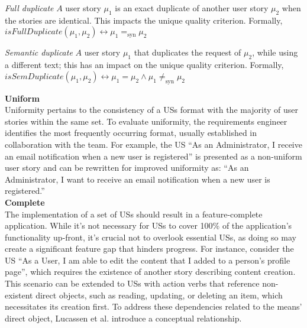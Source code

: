 \begin{definition}
\emph{Full duplicate} $A$ user story $\mu_1$ is an exact duplicate of another user story  $\mu_2$ when the stories are identical. This impacts the unique quality criterion. Formally,\\ 
$isFullDuplicate(\mu_1,\mu_2) \leftrightarrow \mu_1 =_{\text{syn}} \mu_2$
\end{definition}
\begin{definition}
\emph{Semantic duplicate} $A$ user story $\mu_1$ that duplicates the request of $\mu_2$, while using a different text; this has an impact on the unique quality criterion. Formally,\\ 
$isSemDuplicate(\mu_1,\mu_2) \leftrightarrow \mu_1 = \mu_2 \wedge \mu_1 \neq _{\text{syn}} \mu_2$
\end{definition}
\textbf{Uniform}\\ 
Uniformity pertains to the consistency of a USs format with the majority of user stories within the same set. To evaluate uniformity, the requirements engineer identifies the most frequently occurring format, usually established in collaboration with the team. For example, the US \enquote{As an Administrator, I receive an email notiﬁcation when a new user is registered} is presented as a non-uniform user story and can be rewritten for improved uniformity as: \enquote{As an Administrator, I want to receive an email notification when a new user is registered.} \\ 
\textbf{Complete}\\ 
The implementation of a set of USs should result in a feature-complete application. While it's not necessary for USs to cover 100\% of the application's functionality up-front, it's crucial not to overlook essential USs, as doing so may create a significant feature gap that hinders progress. For instance, consider the US \enquote{As a User, I am able to edit the content that I added to a person’s proﬁle page}, which requires the existence of another story describing content creation. This scenario can be extended to USs with action verbs that reference non-existent direct objects, such as reading, updating, or deleting an item, which necessitates its creation first. To address these dependencies related to the means' direct object, Lucassen et al. introduce a conceptual relationship. 
 






